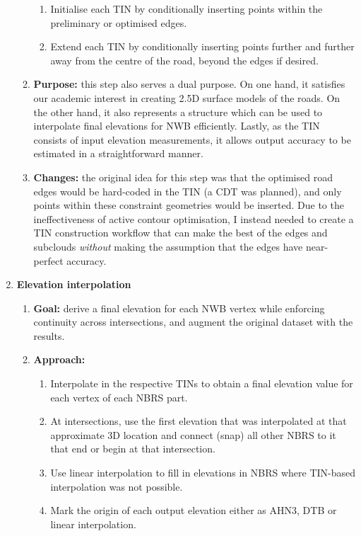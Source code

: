 \begin{enumerate}
\begin{enumerate}
\begin{enumerate}
            \item Initialise each TIN by conditionally inserting points within the preliminary or optimised edges.
            \item Extend each TIN by conditionally inserting points further and further away from the centre of the road, beyond the edges if desired. 
        \end{enumerate}
        \item \textbf{Purpose:} this step also serves a dual purpose. On one hand, it satisfies our academic interest in creating 2.5D surface models of the roads. On the other hand, it also represents a structure which can be used to interpolate final elevations for NWB efficiently. Lastly, as the TIN consists of input elevation measurements, it allows output accuracy to be estimated in a straightforward manner.
        \item \textbf{Changes:} the original idea for this step was that the optimised road edges would be hard-coded in the TIN (a CDT was planned), and only points within these constraint geometries would be inserted. Due to the ineffectiveness of active contour optimisation, I instead needed to create a TIN construction workflow that can make the best of the edges and subclouds \textit{without} making the assumption that the edges have near-perfect accuracy.
    \end{enumerate}
    \item \textbf{Elevation interpolation}
    \begin{enumerate}
        \item \textbf{Goal:} derive a final elevation for each NWB vertex while enforcing continuity across intersections, and augment the original dataset with the results.
        \item \textbf{Approach:}
        \begin{enumerate}
            \item Interpolate in the respective TINs to obtain a final elevation value for each vertex of each NBRS part.
            \item At intersections, use the first elevation that was interpolated at that approximate 3D location and connect (snap) all other NBRS to it that end or begin at that intersection.
            \item Use linear interpolation to fill in elevations in NBRS where TIN-based interpolation was not possible.
            \item Mark the origin of each output elevation either as AHN3, DTB or linear interpolation.

\end{enumerate}
\end{enumerate}
\end{enumerate}
